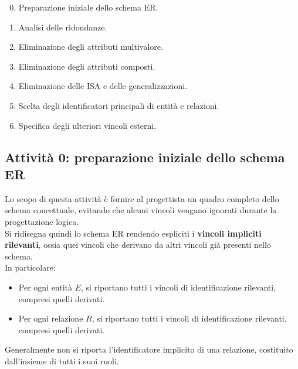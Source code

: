 \begin{enumerate}
    \setcounter{enumi}{-1}
    \item Preparazione iniziale dello schema ER.
    \item Analisi delle ridondanze.
    \item Eliminazione degli attributi multivalore.
    \item Eliminazione degli attributi composti.
    \item Eliminazione delle ISA e delle generalizzazioni.
    \item Scelta degli identificatori principali
    di entità e relazioni.
    \item Specifica degli ulteriori vincoli esterni.
\end{enumerate}

\subsection{Attività 0: preparazione iniziale dello schema ER}
Lo scopo di questa attività è fornire al progettista
un quadro completo dello schema concettuale, evitando
che alcuni vincoli vengano ignorati durante la
progettazione logica.\\
Si ridisegna quindi lo schema ER rendendo espliciti
i \textbf{vincoli impliciti rilevanti}, ossia quei vincoli
che derivano da altri vincoli già presenti nello schema.\\
In particolare:
\begin{itemize}
    \item Per ogni entità $E$, si riportano tutti
    i vincoli di identificazione rilevanti,
    compresi quelli derivati.

    \item Per ogni relazione $R$, si riportano tutti
    i vincoli di identificazione rilevanti,
    compresi quelli derivati.
\end{itemize}
\noindent
Generalmente non si riporta l'identificatore implicito
di una relazione, costituito dall'insieme di tutti
i suoi ruoli.

